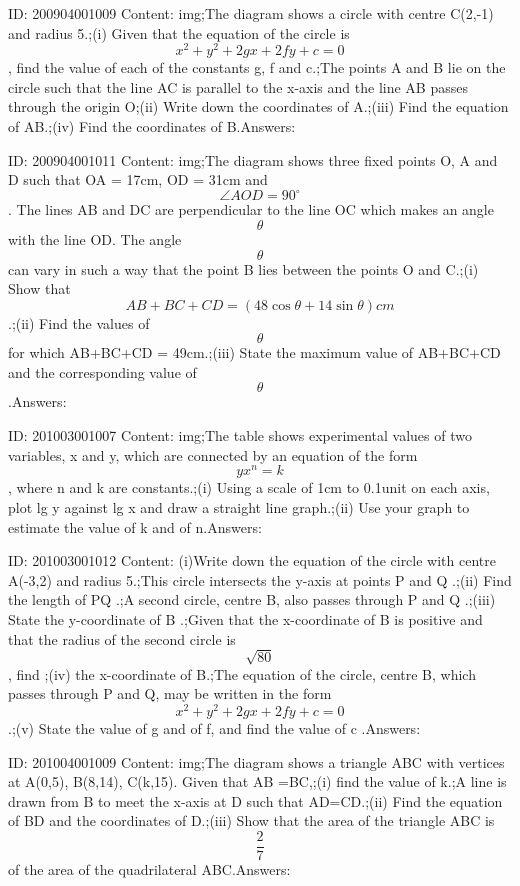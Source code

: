 \documentclass{article}
\begin{document}
ID: 200904001009
Content:
img;The diagram shows a circle with centre C(2,-1) and radius 5.;(i) Given that the equation of the circle is $$x^2 +y^2+2gx+2fy+c=0$$, find the value of each of the constants g, f and c.;The points A and B lie on the circle such that the line AC is parallel to the x-axis and the line AB passes through the origin O;(ii) Write down the coordinates of A.;(iii) Find the equation of AB.;(iv) Find the coordinates of B.Answers:

ID: 200904001011
Content:
img;The diagram shows three fixed points O, A and D such that OA = 17cm, OD = 31cm and $$\angle AOD =90^{\circ}$$. The lines AB and DC are perpendicular to the line OC which makes an angle $$\theta$$ with the line OD. The angle $$\theta$$ can vary in such a way that the point B lies between the points O and C.;(i) Show that $$AB + BC + CD = (48\cos  \theta + 14 \sin  \theta)cm$$.;(ii) Find the values of $$\theta$$ for which AB+BC+CD = 49cm.;(iii) State the maximum value of AB+BC+CD and the corresponding value of $$\theta$$.Answers:

ID: 201003001007
Content:
img;The table shows experimental values of two variables, x and y, which are connected by an equation of the form $$yx^n=k$$, where n and k are constants.;(i) Using a scale of 1cm to 0.1unit on each axis, plot lg y against lg x and draw a straight line graph.;(ii) Use your graph to estimate the value of k and of n.Answers:

ID: 201003001012
Content:
(i)Write down the equation of the circle with centre A(-3,2) and radius 5.;This circle intersects the y-axis at points P and Q .;(ii) Find the length of PQ .;A second circle, centre B, also passes through P and Q .;(iii) State the y-coordinate of B .;Given that the x-coordinate of B is positive and that the radius of the second circle is $$\sqrt{80}$$, find ;(iv) the x-coordinate of B.;The equation of the circle, centre B, which passes through P and Q, may be written in the form $$x^2+y^2+2gx+2fy+c =0$$.;(v) State the value of g and of f, and find the value of c .Answers:

ID: 201004001009
Content:
img;The diagram shows a triangle ABC with vertices at A(0,5), B(8,14), C(k,15). Given that AB =BC,;(i) find the value of k.;A line is drawn from B to meet the x-axis at D such that AD=CD.;(ii) Find the equation of BD and the coordinates of D.;(iii) Show that the area of the triangle ABC is $$\frac{2}{7}$$ of the area of the quadrilateral ABC.Answers:
\end{document}
